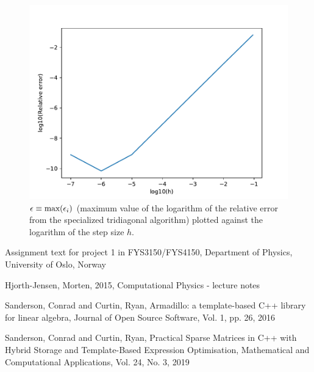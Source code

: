 \documentclass[a4paper,english]{article}
\let\originalleft\left
\let\originalright\right
\renewcommand{\left}{\mathopen{}\mathclose\bgroup\originalleft}
\renewcommand{\right}{\aftergroup\egroup\originalright}
\begin{document}
\begin{figure}[ht]
  \centering
  \includegraphics[width=0.84\linewidth]{error_plot.pdf}
  \caption{$\epsilon \equiv \text{max}\left(\epsilon_i\right)$ (maximum value of the logarithm of the relative error from the specialized tridiagonal algorithm) plotted against the logarithm of the step size $h$.}
  \label{fig:error_plot}
\end{figure}


\begin{thebibliography}{}
    Assignment text for project 1 in FYS3150/FYS4150,
    Department of Physics, University of Oslo, Norway

    Hjorth-Jensen, Morten,
    2015,
    Computational Physics - lecture notes

    Sanderson, Conrad and Curtin, Ryan,
    Armadillo: a template-based C++ library for linear algebra,
    Journal of Open Source Software, Vol. 1, pp. 26, 2016

    Sanderson, Conrad and Curtin, Ryan,
    Practical Sparse Matrices in C++ with Hybrid Storage and Template-Based Expression Optimisation,
    Mathematical and Computational Applications, Vol. 24, No. 3, 2019
\end{thebibliography}
\end{document}
